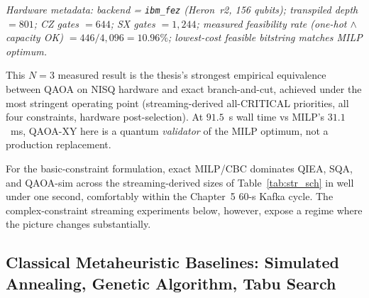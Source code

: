 \begin{table}[!htbp]
\centering
\caption{Complex-constraint streaming experiment at $N=3$ with measured QAOA hardware submission.}
\label{tab:cs_n3}
\small
\renewcommand{\arraystretch}{1.05}
\setlength{\tabcolsep}{4pt}
\par\vspace{2pt}
\footnotesize\textit{Hardware metadata: backend = \texttt{ibm\_fez} (Heron~r2, 156 qubits); transpiled depth $= 801$; CZ gates $= 644$; SX gates $= 1{,}244$; measured feasibility rate (one-hot $\wedge$ capacity OK) $= 446 / 4{,}096 = 10.96\%$; lowest-cost feasible bitstring matches MILP optimum.}
\end{table}
\FloatBarrier

This $N=3$ measured result is the thesis's strongest empirical equivalence between QAOA on NISQ hardware and exact branch-and-cut, achieved under the most stringent operating point (streaming-derived all-CRITICAL priorities, all four constraints, hardware post-selection). At $91.5$~s wall time vs MILP's $31.1$~ms, QAOA-XY here is a quantum \emph{validator} of the MILP optimum, not a production replacement.

For the basic-constraint formulation, exact MILP/CBC dominates QIEA, SQA, and QAOA-sim across the streaming-derived sizes of Table~\ref{tab:str_sch} in well under one second, comfortably within the Chapter~5 60-s Kafka cycle. The complex-constraint streaming experiments below, however, expose a regime where the picture changes substantially.

\subsection{Classical Metaheuristic Baselines: Simulated Annealing, Genetic Algorithm, Tabu Search}
\label{sec:metaheuristics}

